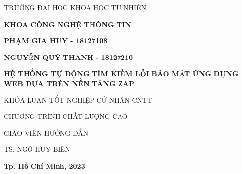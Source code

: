 \newpage
\begin{center}
        
    \large TRƯỜNG ĐẠI HỌC KHOA HỌC TỰ NHIÊN 
    
    \textbf{\large KHOA CÔNG NGHỆ THÔNG TIN }
    
    \vspace{2cm}
    
    \textbf{\large PHẠM GIA HUY - 18127108}
    
    \textbf{\large NGUYỄN QUÝ THANH - 18127210}
    
    \vspace{2cm}
    
    \textbf{\LARGE HỆ THỐNG TỰ ĐỘNG TÌM KIẾM LỖI BẢO MẬT ỨNG DỤNG WEB DỰA TRÊN NỀN TẢNG ZAP }
    
    \vspace{2cm}
    
    \large KHÓA LUẬN TỐT NGHIỆP CỬ NHÂN CNTT

    \large CHƯƠNG TRÌNH CHẤT LƯỢNG CAO
    
    \vspace{2cm}
    
    \large GIÁO VIÊN HƯỚNG DẪN
    
    \large TS. NGÔ HUY BIÊN
    
    \vspace{3.5cm}
    
    \textbf{\large Tp. Hồ Chí Minh, 2023 }    
\end{center}


    

    